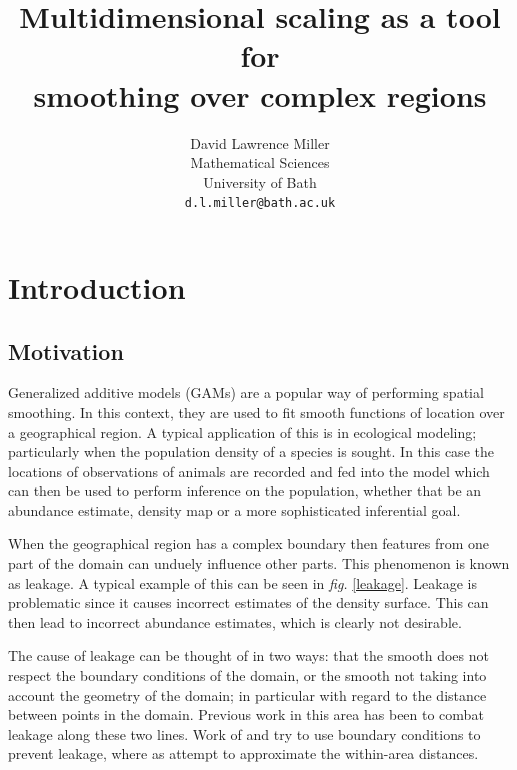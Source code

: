 \documentclass[a4paper,10pt]{article}
\title{Multidimensional scaling as a tool for \\smoothing over complex regions}
\author{David Lawrence Miller\\Mathematical Sciences\\University of Bath\\\texttt{d.l.miller@bath.ac.uk}}
\newcommand{\fig}[1]{\emph{fig.} \ref{#1}}
\begin{document}
 
 
 
\newtheorem{thm}{Theorem}[section]
 
\newtheorem{defn}{Definition}[section]
 
\maketitle


\section{Introduction}

\subsection{Motivation}

Generalized additive models (GAMs) are a popular way of performing spatial smoothing. In this context, they are used to fit smooth functions of location over a geographical region. A typical application of this is in ecological modeling; particularly when the population density of a species is sought. In this case the locations of observations of animals are recorded and fed into the model which can then be used to perform inference on the population, whether that be an abundance estimate, density map or a more sophisticated inferential goal.

When the geographical region has a complex boundary then features from one part of the domain can unduely influence other parts. This phenomenon is known as leakage. A typical example of this can be seen in \fig{leakage}. Leakage is problematic since it causes incorrect estimates of the density surface. This can then lead to incorrect abundance estimates, which is clearly not desirable.

The cause of leakage can be thought of in two ways: that the smooth does not respect the boundary conditions of the domain, or the smooth not taking into account the geometry of the domain; in particular with regard to the distance between points in the domain. Previous work in this area has been to combat leakage along these two lines. Work of \cite{ramsay} and \cite{soap} try to use boundary conditions to prevent leakage, where as \cite{wangranalli} attempt to approximate the within-area distances.
\end{document}
